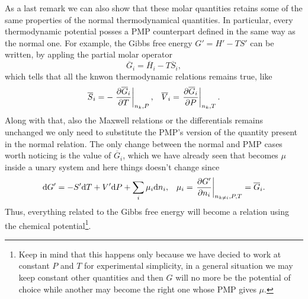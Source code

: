As a last remark we can also show that these molar quantities retains some of the same properties of the normal thermodynamical quantities. In particular, every thermodynamic potential posses a PMP counterpart defined in the same way as the normal one. For example, the Gibbs free energy $G' = H' - TS'$ can be written, by appling the partial molar operator
\begin{equation}
    \overline{G}_i = \overline{H}_i - T \overline{S}_i,
\end{equation}
which tells that all the knwon thermodynamic relations remains true, like
\begin{align}
    &\overline{S}_i = -\eval{\pdv{\overline{G}_i}{T}}_{n_k, P}, &\overline{V}_i = \eval{\pdv{\overline{G}_i}{P}}_{n_k, T}.
\end{align}
Along with that, also the Maxwell relations or the differentials remains unchanged we only need to substitute the PMP's version of the quantity present in the normal relation. The only change between the normal and PMP cases worth noticing is the value of $\overline{G}_i$, which we have already seen that becomes $\mu$ inside a unary system and here things doesn't change since
\begin{align}
    & \dd G' = - S'\dd T + V'\dd P + \sum_i \mu_i \dd n_i, & \mu_i = \eval{\pdv{G'}{n_i}}_{n_{k\neq i}, P, T} = \overline{G}_i.
\end{align}
Thus, everything related to the Gibbs free energy will become a relation using the chemical potential\footnote{Keep in mind that this happens only because we have decied to work at constant $P$ and $T$ for experimental simplicity, in a general situation we may keep constant other quantities and then $G$ will no more be the potential of choice while another may become the right one whose PMP gives $\mu$.}.

